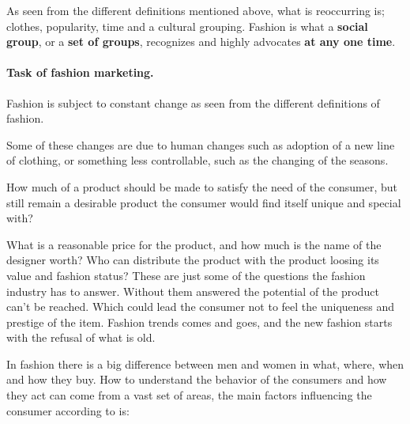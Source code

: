 As seen from the different definitions mentioned above, what is reoccurring is;
clothes, popularity, time and a cultural grouping. Fashion is what a
\textbf{social group}, or a \textbf{set of groups}, recognizes and highly
advocates \textbf{at any one time}.

\paragraph{Task of fashion marketing.}
Fashion is subject to constant change as seen from the different definitions of
fashion.

Some of these changes are due to human changes such as adoption of a new line
of clothing, or something less controllable, such as the changing of the
seasons.

How much of a product should be made to satisfy the need of the consumer, but
still remain a desirable product the consumer would find itself unique and
special with?

What is a reasonable price for the product, and how much is the name of the
designer worth?  Who can distribute the product with the product loosing its
value and fashion status?  These are just some of the questions the fashion
industry has to answer.  Without them answered the potential of the product
can't be reached.  Which could lead the consumer not to feel the uniqueness and
prestige of the item.  Fashion trends comes and goes, and the new fashion
starts with the refusal of what is old.


In fashion there is a big difference between men and women in what, where, when
and how they buy.  How to understand the behavior of the consumers and how they
act can come from a vast set of areas, the main factors influencing the
consumer according to \cite{kotler2009marketing} is:

